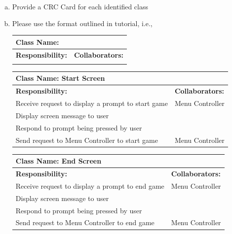 \documentclass[12pt, titlepage]{article}
\begin{document}
\begin{enumerate}[a)]
	\item Provide a CRC Card for each identified class
	\item Please use the format outlined in tutorial, i.e., 
	\begin{table}[ht]
		\centering
		\begin{tabular}{|p{5cm}|p{5cm}|}
		\hline 
		 \multicolumn{2}{|l|}{\textbf{Class Name:}} \\
		\hline
		\textbf{Responsibility:} & \textbf{Collaborators:} \\
		\hline
		\vspace{1in} & \\
		\hline
		\end{tabular}
	\end{table}

	\begin{table}[H]
		\centering
		\begin{tabular}{|p{5cm}|p{5cm}|}
		\hline 
		 \multicolumn{2}{|l|}{\textbf{Class Name: Start Screen}} \\
		\hline
		\textbf{Responsibility:} & \textbf{Collaborators:} \\
		\hline
		 Receive request to display a prompt to start game& Menu Controller \\
		\hline
		 Display screen message to user& \\
		\hline
		 Respond to prompt being pressed by user& \\
		\hline
		 Send request to Menu Controller to start game& Menu Controller \\
		\hline
		\end{tabular}
	\end{table}
	
	\begin{table}[H]
		\centering
		\begin{tabular}{|p{5cm}|p{5cm}|}
		\hline 
		 \multicolumn{2}{|l|}{\textbf{Class Name: End Screen}} \\
		\hline
		\textbf{Responsibility:} & \textbf{Collaborators:} \\
		\hline
		 Receive request to display a prompt to end game& Menu Controller \\
		\hline
		 Display screen message to user& \\
		\hline
		 Respond to prompt being pressed by user& \\
		\hline
		 Send request to Menu Controller to end game& Menu Controller \\
		\hline
		\end{tabular}
	\end{table}
	

\end{enumerate}
\end{document}
